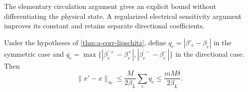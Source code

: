The elementary circulation argument gives an explicit bound without
differentiating the physical state. A regularized electrical sensitivity
argument improves its constant and retains separate directional
coefficients.

\begin{proposition}
\label{prop:a-corr-sharper}
Under the hypotheses of \cref{thm:a-corr-lipschitz}, define
$q_e=|\beta'_e-\beta_e|$ in the symmetric case and
$q_e=\max\{|\beta_e^{\prime+}-\beta_e^+|,
|\beta_e^{\prime-}-\beta_e^-|\}$ in the directional case. Then
\begin{equation}
 \|x'-x\|_\infty\le\frac{M}{2\beta_L}\sum_e q_e
 \le\frac{mM\delta}{2\beta_L}.
 \label{eq:a-corr-sharper-flow}
\end{equation}
\end{proposition}
